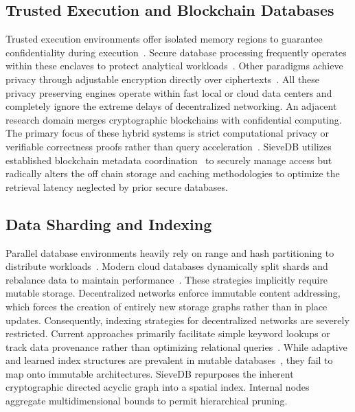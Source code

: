 \subsection{Trusted Execution and Blockchain Databases}
\label{sec:tee}
Trusted execution environments offer isolated memory regions to guarantee confidentiality during execution~\cite{costan2016intel}. Secure database processing frequently operates within these enclaves to protect analytical workloads~\cite{priebe2018enclavedb, zheng2017opaque}. Other paradigms achieve privacy through adjustable encryption directly over ciphertexts~\cite{popa2011cryptdb}. All these privacy preserving engines operate within fast local or cloud data centers and completely ignore the extreme delays of decentralized networking. An adjacent research domain merges cryptographic blockchains with confidential computing. The primary focus of these hybrid systems is strict computational privacy or verifiable correctness proofs rather than query acceleration~\cite{zyskind2018enigma, xu2019vchain}. SieveDB utilizes established blockchain metadata coordination~\cite{hossain2025mtdb} to securely manage access but radically alters the off chain storage and caching methodologies to optimize the retrieval latency neglected by prior secure databases.

\subsection{Data Sharding and Indexing}
\label{sec:sharding}
Parallel database environments heavily rely on range and hash partitioning to distribute workloads~\cite{dewitt1992parallel}. Modern cloud databases dynamically split shards and rebalance data to maintain performance~\cite{taft2020cockroachdb, bacon2017spanner, luo2022dynahash}. These strategies implicitly require mutable storage. Decentralized networks enforce immutable content addressing, which forces the creation of entirely new storage graphs rather than in place updates. Consequently, indexing strategies for decentralized networks are severely restricted. Current approaches primarily facilitate simple keyword lookups or track data provenance rather than optimizing relational queries~\cite{arer2022efficient, rathee2019blockchain}. While adaptive and learned index structures are prevalent in mutable databases~\cite{kraska2018case}, they fail to map onto immutable architectures. SieveDB repurposes the inherent cryptographic directed acyclic graph into a spatial index. Internal nodes aggregate multidimensional bounds to permit hierarchical pruning.

